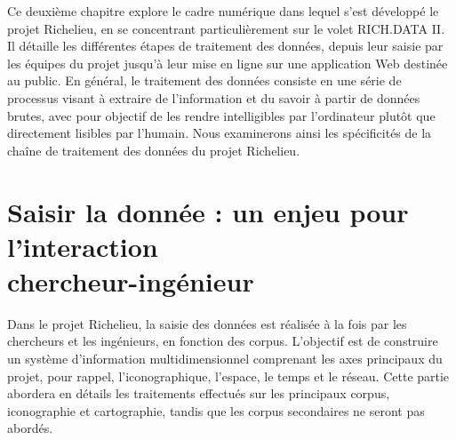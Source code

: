 Ce deuxième chapitre explore le cadre numérique dans lequel s'est développé le projet Richelieu, en se concentrant particulièrement sur le volet RICH.DATA II. Il détaille les différentes étapes de traitement des données, depuis leur saisie par les équipes du projet jusqu'à leur mise en ligne sur une application Web destinée au public. En général, le traitement des données consiste en une série de processus visant à extraire de l'information et du savoir à partir de données brutes, avec pour objectif de les rendre intelligibles par l'ordinateur plutôt que directement lisibles par l'humain. Nous examinerons ainsi les spécificités de la chaîne de traitement des données du projet Richelieu.

\section{Saisir la donnée : un enjeu pour l'interaction \\chercheur-ingénieur}
Dans le projet Richelieu, la saisie des données est réalisée à la fois par les chercheurs et les ingénieurs, en fonction des corpus. L'objectif est de construire un système d'information multidimensionnel comprenant les axes principaux du projet, pour rappel, l'iconographique, l'espace, le temps et le réseau. Cette partie abordera en détails les traitements effectués sur les principaux corpus, iconographie et cartographie, tandis que les corpus secondaires ne seront pas abordés.

